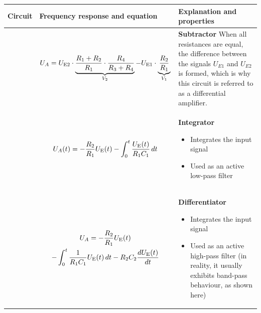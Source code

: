 \begin{table}[ht]
    \renewcommand{\tablename}{Table}
    \begin{tabular}{|m{}|m{}|m{}|}
     \hline 
    Circuit & Frequency response and equation & Explanation and properties \\ %
    \hline
    
      &
      \begin{center}
      
 \end{center}
 \vspace{1ex}
 \[
 \begin{aligned}
    {U_A} = {U_{{\textnormal{E2}}}} \cdot \underbrace{ \frac{R_1 + R_2}{R_1} \cdot \frac{R_4}{R_3 + R_4}}_{V_2} - U_{\textnormal{E1}} \cdot \underbrace{\frac{R_2}{R_1}}_{V_1}
\end{aligned}
 \]
     &
     \textbf{Subtractor}\newline
     When all resistances are equal, the difference between the signals $U_{E1}$ and $U_{E2}$ is formed, which is why this circuit is referred to as a differential amplifier.
     \\ %
     \hline

    
     & 
     \begin{center}
    
     \[
     U_A(t) = - \frac{R_2}{R_1} U_{\textnormal{E}}(t) - \int_0^t \frac{U_{\textnormal{E}}(t)}{R_1 C_1} \, dt
     \]
     \end{center} 
     &
    \textbf{Integrator}\newline
    \begin{itemize}
        \item Integrates the input signal
        \item Used as an active low-pass filter
    \end{itemize}
      \\ 
      \hline
    
    &
    \begin{center}
    
    \begin{multline*}
        U_A = - \frac{R_2}{R_1} U_{\textnormal{E}}(t) \\
        - \int_0^t \frac{1}{R_1 C_1} U_{\textnormal{E}}(t) \, dt 
        - R_2 C_2\frac{dU_{\textnormal{E}}(t)}{dt}
    \end{multline*}
    \end{center} 
    & 
    \textbf{Differentiator}\newline
    \begin{itemize}
        \item Integrates the input signal
        \item Used as an active high-pass filter (in reality, it usually exhibits band-pass behaviour, as shown here)
    \end{itemize}
    \\
    \hline
\end{tabular}
\end{table}






